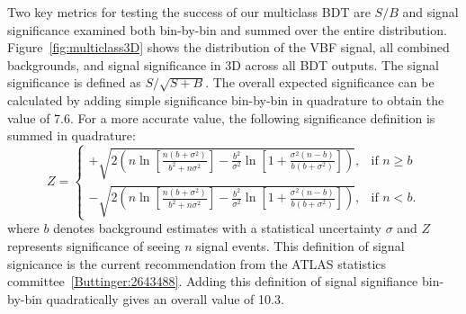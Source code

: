 Two key metrics for testing the success of our multiclass BDT are $S/B$ and signal significance examined both bin-by-bin and summed over the entire distribution. Figure~\ref{fig:multiclass3D} shows the distribution of the VBF signal, all combined backgrounds, and signal significance in 3D across all BDT outputs. The signal significance is defined as $S/\sqrt{S+B}$. The overall expected significance can be calculated by adding simple significance bin-by-bin in quadrature to obtain the value of 7.6. For a more accurate value, the following significance definition is summed in quadrature:
\[
    Z = 
\begin{cases}
    +\sqrt{2(n\ln[\frac{n(b+\sigma^2)}{b^2+n\sigma^2}]-\frac{b^2}{\sigma^2}\ln[1+\frac{\sigma^2(n-b)}{b(b+\sigma^2)}])},& \text{if } n\geq b\\
    -\sqrt{2(n\ln[\frac{n(b+\sigma^2)}{b^2+n\sigma^2}]-\frac{b^2}{\sigma^2}\ln[1+\frac{\sigma^2(n-b)}{b(b+\sigma^2)}])},& \text{if } n<b .
\end{cases}
\] 
where $b$ denotes background estimates with a statistical uncertainty $\sigma$ and $Z$ represents significance of seeing $n$ signal events. This definition of signal signicance is the current recommendation from the ATLAS statistics committee~\ref{Buttinger:2643488}. Adding this definition of signal signifiance bin-by-bin quadratically gives an overall value of 10.3.

